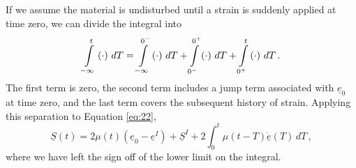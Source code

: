 If we assume the material is undisturbed until a strain is suddenly
applied at time zero, we can divide the integral into
\begin{equation}
\intop_{-\infty}^{t}\left(\cdot\right)\, dT=\intop_{-\infty}^{0^{-}}\left(\cdot\right)\, dT+\intop_{0^{-}}^{0^{+}}\left(\cdot\right)\, dT+\intop_{0^{+}}^{t}\left(\cdot\right)\, dT\,.\label{eq:27}
\end{equation}
The first term is zero, the second term includes a jump term associated
with $\underline{e}_{0}$ at time zero, and the last term covers the
subsequent history of strain. Applying this separation to Equation
\ref{eq:22},
\begin{equation}
\underline{S}\left(t\right)=2\mu\left(t\right)\left(\underline{e}_{0}-\underline{e}^{I}\right)+\underline{S}^{I}+2\int_{0}^{t}\mu\left(t-T\right)\underline{\dot{e}}\left(T\right)\, dT\,,\label{eq:28}
\end{equation}
where we have left the sign off of the lower limit on the integral.

